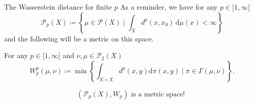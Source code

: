 \documentclass[10pt]{beamer}
\theoremstyle{reminder}
\begin{document}

\begin{frame}{The Wasserstein distance for finite $p$} 
    As a reminder, we have for any $p \in [1,\infty[$
    $$\mathcal{P}_p(X) \coloneqq \left\{\mu \in \mathcal{P}(X) \mid \int_X d^p(x, x_0) \, \mathrm{d}\mu(x) < \infty \right\}$$ and the following will be a metric on this space. 
    \begin{definition}
        For any $p \in [1,\infty[$ and $\nu,\mu \in \mathcal{P}_2(X)$
        $$W_p^p(\mu,\nu) \coloneqq \min \left\{\int_{X\times X}d^p(x,y)\mathrm{d}\pi(x,y) \mid \pi\in\Gamma(\mu,\nu)\right\}.$$
    \end{definition}
    \begin{theorem}
        $$(\mathcal{P}_p(X), W_p) \text{ is a metric space! }$$
    \end{theorem}
\end{frame}
\end{document}

